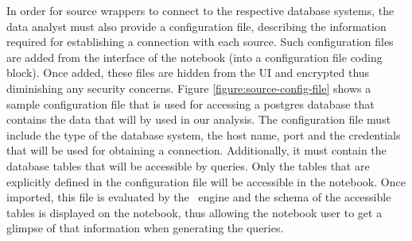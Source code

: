  In order for source wrappers to connect to the respective database systems, the data analyst must also provide a configuration file, describing the information required for establishing a connection with each source. Such configuration files are added from the interface of the notebook (into a configuration file coding block). Once added, these files are hidden from the UI and encrypted thus diminishing any security concerns. Figure \ref{figure:source-config-file} shows a sample configuration file that is used for accessing a postgres database that contains the data that will by used in our analysis. The configuration file must include the type of the database system, the host name, port and the credentials that will be used for obtaining a connection. Additionally, it must contain the database tables that will be accessible by queries. Only the tables that are explicitly defined in the configuration file will be accessible in the notebook. Once imported, this file is evaluated by the \projname\ engine and the schema of the accessible tables is displayed on the notebook, thus allowing the notebook user to get a glimpse of that information when generating the queries. 



